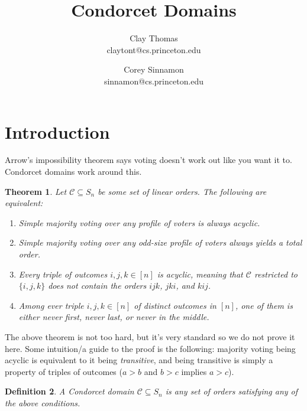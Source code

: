 \documentclass[12pt]{article}
\newtheorem{theorem}{Theorem}
\newtheorem{definition}[theorem]{Definition}
\newcommand{\C}{\mathcal{C}}
\newcommand{\1}[1]{\mathds{1}[{#1}]}
\begin{document}
\title{
  Condorcet Domains
}
\author{
  Clay Thomas \\
  claytont@cs.princeton.edu
\and
  Corey Sinnamon \\
  sinnamon@cs.princeton.edu
}

\maketitle

\section{Introduction}

  Arrow's impossibility theorem says voting doesn't work out like you want it to.
  Condorcet domains work around this.

  \begin{theorem} \label{thrmCondorcetProps}
    Let $\C \subseteq S_n$ be some set of linear orders.
    The following are equivalent:
    \begin{enumerate}
      \item Simple majority voting over any profile of voters is always acyclic.
      \item Simple majority voting over any odd-size profile of voters
        always yields a total order.
      \item Every triple of outcomes $i,j,k\in[n]$ is \emph{acyclic}, meaning
        that $\C$ restricted to $\{i,j,k\}$ does not contain the orders
        $ijk$, $jki$, and $kij$.
      \item \label{thrmCondorcetPropsValRestr}
        Among ever triple $i,j,k\in [n]$ of distinct outcomes in $[n]$,
        one of them is either never first, never last, or never in the middle.
    \end{enumerate}

  \end{theorem}

  The above theorem is not too hard, but it's very standard so we do not prove
  it here. Some intuition/a guide to the proof is the following:
  majority voting being acyclic is equivalent to it being \emph{transitive},
  and being transitive is simply a property of triples of outcomes
  ($a>b$ and $b>c$ implies $a>c$).

  \begin{definition}
    A Condorcet domain $\C\subseteq S_n$ is any set of orders satisfying any of
    the above conditions.
  \end{definition}
\end{document}
